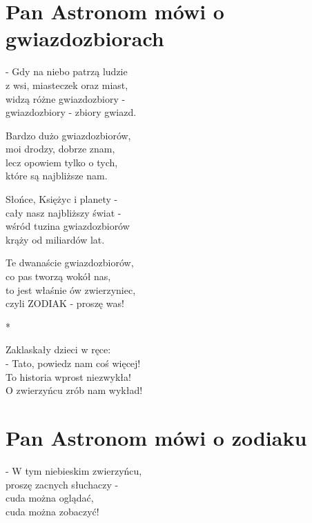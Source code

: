 \documentclass[11pt,a4pape,leqno,twoside]{book}
\begin{document}
\chapter{Pan Astronom mówi o gwiazdozbiorach}
- Gdy na niebo patrzą ludzie\\
z wsi, miasteczek oraz miast,\\
widzą różne gwiazdozbiory -\\
gwiazdozbiory - zbiory gwiazd.\\ \vspace{0.1cm}

Bardzo dużo gwiazdozbiorów,\\
moi drodzy, dobrze znam,\\
lecz opowiem tylko o tych,\\
które są najbliższe nam.\\ \vspace{0.1cm}

Słońce, Księżyc i planety -\\
cały nasz najbliższy świat -\\
wśród tuzina gwiazdozbiorów\\
krąży od miliardów lat.\\ \vspace{0.1cm}

Te dwanaście gwiazdozbiorów,\\
co pas tworzą wokół nas,\\
to jest właśnie ów zwierzyniec,\\
czyli ZODIAK - proszę was!\\ \vspace{0.1cm}

*\\ \vspace{0.1cm}

Zaklaskały dzieci w ręce:\\
- Tato, powiedz nam coś więcej!\\
To historia wprost niezwykła!\\
O zwierzyńcu zrób nam wykład!

\chapter{Pan Astronom mówi o zodiaku}
- W tym niebieskim zwierzyńcu,\\
proszę zacnych słuchaczy -\\
cuda można oglądać,\\
cuda można zobaczyć!\\ \vspace{0.1cm}
\end{document}
